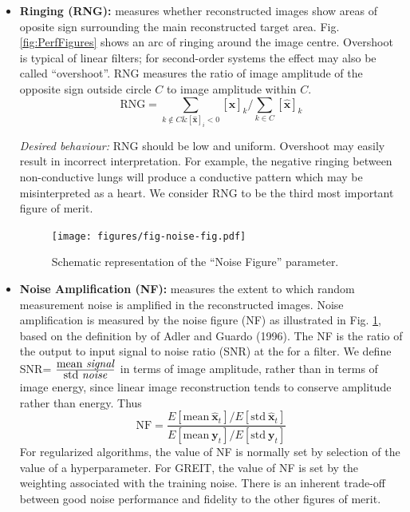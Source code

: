 \documentclass[12pt]{iopart}
\newcommand{\xH}{\mbox{$\mathbf{\hat x}$}}
\newcommand{\yB}{\mbox{$\mathbf{y}$}}
\begin{document}
\begin{itemize}
\hspace{5mm}
{\em Desired behaviour:}
SD should be low and uniform. Large SD may result in
incorrect interpretation of images, although this
effect is less important than other artefacts. We 
consider SD to be the fifth most important figure 
of merit.

\item
{\bf Ringing (RNG):}
measures whether reconstructed images show
areas of oposite sign surrounding the main 
reconstructed target area. Fig. \ref{fig:PerfFigures}
shows an arc of ringing around the image centre.
Overshoot is typical of linear filters; for second-order
systems the effect may also be called ``overshoot''.
RNG measures the ratio of image amplitude of
the opposite sign outside circle $C$ to image
amplitude within $C$.
\begin{equation}
\mathrm{RNG} = \sum_{k\not\in C \& [\xH]_i < 0} [\xH]_k / 
               \sum_{k\in C}                    [\xH]_k 
\end{equation}

\hspace{5mm}
{\em Desired behaviour:}
RNG should be low and uniform. Overshoot may
easily result in incorrect interpretation. For
example, the negative ringing between non-conductive
lungs will produce a conductive pattern which 
may be misinterpreted as a heart.
We consider RNG to be the third most important figure 
of merit.

\begin{figure}[bhtp]
\begin{center}
\texttt{[image: figures/fig-noise-fig.pdf]}
\caption{ \label{fig:noise_fig}
Schematic representation of the ``Noise Figure''
parameter.
}
\end{center}
\end{figure}

\item
{\bf Noise Amplification (NF):}
measures the extent to which random
measurement noise is amplified
in the reconstructed images. Noise amplification
is measured by the noise figure (NF) as
illustrated in Fig. \ref{fig:noise_fig}, 
based on the definition by of Adler and Guardo (1996).
The NF is the ratio of the output to input
 signal to noise ratio (SNR) at the for a filter.
We define SNR=
$\frac{
   \mbox{mean \em signal}
      }{
   \mbox{std \em noise}
     }
$ 
in terms of image amplitude,
rather than in terms of image energy, since linear
image reconstruction tends to conserve  amplitude
rather than energy. Thus
\begin{equation}
\mathrm{NF} = \frac{
   E[ \mathrm{mean}~\xH_t ] 
         /
   E[ \mathrm{std}~\xH_t ]
}{
   E[ \mathrm{mean}~\yB_t ] 
         /
   E[ \mathrm{std}~\yB_t ]
}
\end{equation}
For regularized algorithms, the value of NF is normally
set by selection of the value of 
a hyperparameter. For GREIT, the value of NF is set by the weighting
associated with the training noise. There is an inherent
trade-off between good noise performance and fidelity to
the other figures of merit.


\end{itemize}
\end{document}
